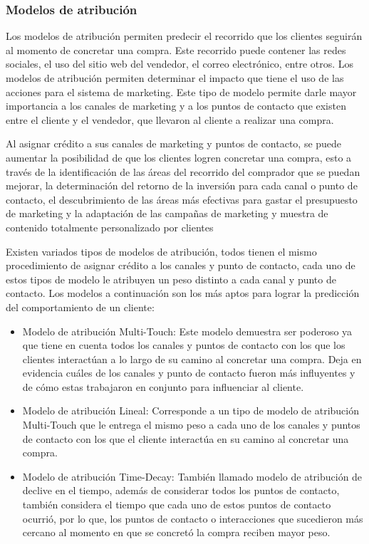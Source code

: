 \subsubsection{Modelos de atribución}

Los modelos de atribución permiten predecir el recorrido que los clientes seguirán al momento de concretar una compra. Este recorrido puede contener las redes sociales, el uso del sitio web del vendedor, el correo electrónico, entre otros. Los modelos de atribución permiten determinar el impacto que tiene el uso de las acciones para el sistema de marketing. Este tipo de modelo permite darle mayor importancia a los canales de marketing y a los puntos de contacto que existen entre el cliente y el vendedor, que llevaron al cliente a realizar una compra.

Al asignar crédito a sus canales de marketing y puntos de contacto, se puede aumentar la posibilidad de que los clientes logren concretar una compra, esto a través de la identificación de las áreas del recorrido del comprador que se puedan mejorar, la determinación del retorno de la inversión para cada canal o punto de contacto, el descubrimiento de las áreas más efectivas para gastar el presupuesto de marketing y la adaptación de las campañas de marketing y muestra de contenido totalmente personalizado por clientes \cite{modelo-atribucion}

Existen variados tipos de modelos de atribución, todos tienen el mismo procedimiento de asignar crédito a los canales y punto de contacto, cada uno de estos tipos de modelo le atribuyen un peso distinto a cada canal y punto de contacto. Los modelos a continuación son los más aptos para lograr la predicción del comportamiento de un cliente:

\begin{itemize}
\item Modelo de atribución Multi-Touch: Este modelo demuestra ser poderoso ya que tiene en cuenta todos los canales y puntos de contacto con los que los clientes interactúan a lo largo de su camino al concretar una compra. Deja en evidencia cuáles de los canales y punto de contacto fueron más influyentes y de cómo estas trabajaron en conjunto para influenciar al cliente.
\item Modelo de atribución Lineal: Corresponde a un tipo de modelo de atribución Multi-Touch que le entrega el mismo peso a cada uno de los canales y puntos de contacto con los que el cliente interactúa en su camino al concretar una compra.
\item Modelo de atribución Time-Decay: También llamado modelo de atribución de declive en el tiempo, además de considerar todos los puntos de contacto, también considera el tiempo que cada uno de estos puntos de contacto ocurrió, por lo que, los puntos de contacto o interacciones que sucedieron más cercano al momento en que se concretó la compra reciben mayor peso.
\end{itemize}

